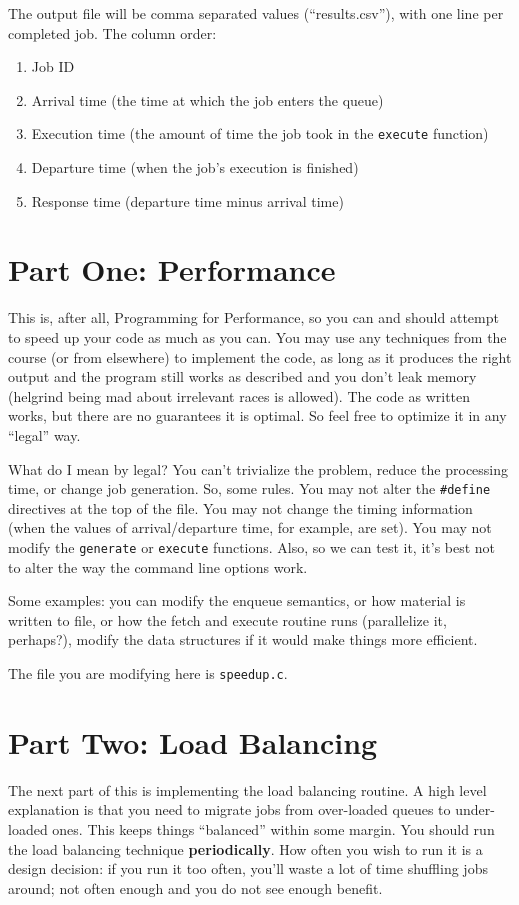 \documentclass[letterpaper,10pt]{article}
\begin{document}
The output file will be comma separated values (``results.csv''), with one line per completed job. The column order:
\begin{enumerate}
	\item Job ID
	\item Arrival time (the time at which the job enters the queue)
	\item Execution time (the amount of time the job took in the \texttt{execute} function)
	\item Departure time (when the job's execution is finished)
	\item Response time (departure time minus arrival time)
\end{enumerate}


\section*{Part One: Performance}

This is, after all, Programming for Performance, so you can and should attempt to speed up your code as much as you can. You may use any techniques from the course (or from elsewhere) to implement the code, as long as it produces the right output and the program still works as described and you don't leak memory (helgrind being mad about irrelevant races is allowed). The code as written works, but there are no guarantees it is optimal. So feel free to optimize it in any ``legal'' way.

What do I mean by legal? You can't trivialize the problem, reduce the processing time, or change job generation. So, some rules. You may not alter the \texttt{\#define} directives at the top of the file. You may not change the timing information (when the values of arrival/departure time, for example, are set). You may not modify the \texttt{generate} or \texttt{execute} functions. Also, so we can test it, it's best not to alter the way the command line options work. 

Some examples: you can modify the enqueue semantics, or how material is written to file, or how the fetch and execute routine runs (parallelize it, perhaps?), modify the data structures if it would make things more efficient.

The file you are modifying here is \texttt{speedup.c}.


\section*{Part Two: Load Balancing}
The next part of this is implementing the load balancing routine. A high level explanation is that you need to migrate jobs from over-loaded queues to under-loaded ones. This keeps things ``balanced'' within some margin. You should run the load balancing technique \textbf{periodically}. How often you wish to run it is a design decision: if you run it too often, you'll waste a lot of time shuffling jobs around; not often enough and you do not see enough benefit.
\end{document}
